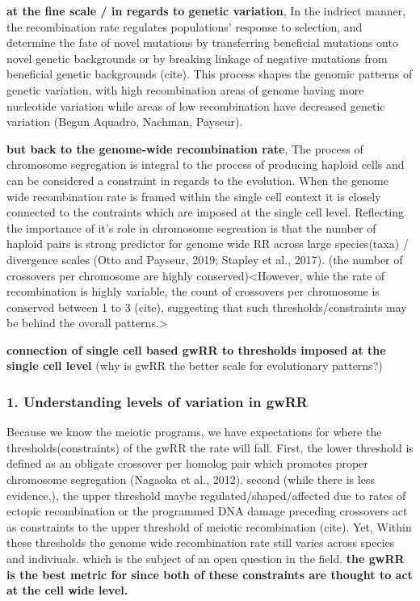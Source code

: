 \documentclass[
]{article}
\begin{document}
\textbf{at the fine scale / in regards to genetic variation}, In the
indriect manner, the recombination rate regulates populations' response
to selection, and determine the fate of novel mutations by transferring
beneficial mutations onto novel genetic backgrounds or by breaking
linkage of negative mutations from beneficial genetic backgrounds
(cite). This process shapes the genomic patterns of genetic variation,
with high recombination areas of genome having more nucleotide variation
while areas of low recombination have decreased genetic variation (Begun
Aquadro, Nachman, Payseur).

\textbf{but back to the genome-wide recombination rate}, The process of
chromosome segregation is integral to the process of producing haploid
cells and can be considered a constraint in regards to the evolution.
When the genome wide recombination rate is framed within the single cell
context it is closely connected to the contraints which are imposed at
the single cell level. Reflecting the importance of it's role in
chromosome segreation is that the number of haploid pairs is strong
predictor for genome wide RR across large species(taxa) / divergence
scales (Otto and Payseur, 2019; Stapley et al., 2017). (the number of
crossovers per chromosome are highly conserved)\textless However, whie
the rate of recombination is highly variable, the count of crossovers
per chromosome is conserved between 1 to 3 (cite), suggesting that such
thresholds/constraints may be behind the overall patterns.\textgreater{}

\textbf{connection of single cell based gwRR to thresholds imposed at
the single cell level} (why is gwRR the better scale for evolutionary
patterns?)

\hypertarget{understanding-levels-of-variation-in-gwrr}{%
\subsubsection{1. Understanding levels of variation in
gwRR}\label{understanding-levels-of-variation-in-gwrr}}

Because we know the meiotic programs, we have expectations for where the
thresholds(constraints) of the gwRR the rate will fall. First, the lower
threshold is defined as an obligate crossover per homolog pair which
promotes proper chromosome segregation (Nagaoka et al., 2012). second
(while there is less evidence,), the upper threshold maybe
regulated/shaped/affected due to rates of ectopic recombination or the
programmed DNA damage preceding crossovers act as constraints to the
upper threshold of meiotic recombination (cite). Yet, Within these
thresholds the genome wide recombination rate still varies across
species and indiviuals. which is the subject of an open question in the
field. \textbf{the gwRR is the best metric for since both of these
constraints are thought to act at the cell wide level.}
\end{document}
